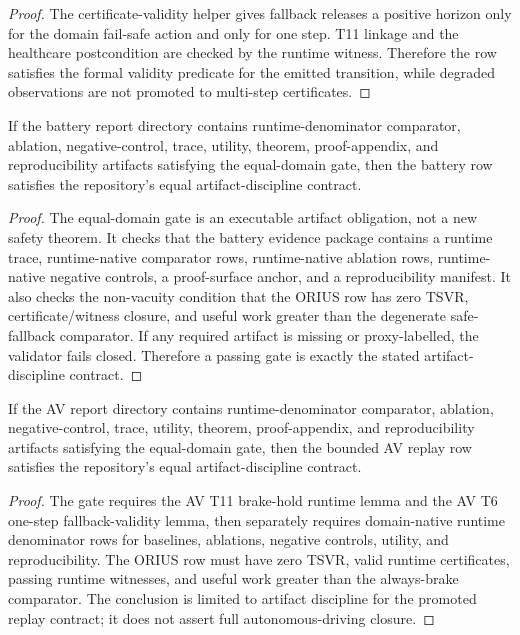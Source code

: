 \begin{proof}
The certificate-validity helper gives fallback releases a positive horizon
only for the domain fail-safe action and only for one step.  T11 linkage and
the healthcare postcondition are checked by the runtime witness.  Therefore
the row satisfies the formal validity predicate for the emitted transition,
while degraded observations are not promoted to multi-step certificates.
\end{proof}

\begin{lemma}
If the battery report directory contains runtime-denominator comparator,
ablation, negative-control, trace, utility, theorem, proof-appendix, and
reproducibility artifacts satisfying the equal-domain gate, then the battery
row satisfies the repository's equal artifact-discipline contract.
\end{lemma}

\begin{proof}
The equal-domain gate is an executable artifact obligation, not a new safety
theorem.  It checks that the battery evidence package contains a runtime
trace, runtime-native comparator rows, runtime-native ablation rows,
runtime-native negative controls, a proof-surface anchor, and a
reproducibility manifest.  It also checks the non-vacuity condition that the
ORIUS row has zero TSVR, certificate/witness closure, and useful work greater
than the degenerate safe-fallback comparator.  If any required artifact is
missing or proxy-labelled, the validator fails closed.  Therefore a passing
gate is exactly the stated artifact-discipline contract.
\end{proof}

\begin{lemma}
If the AV report directory contains runtime-denominator comparator,
ablation, negative-control, trace, utility, theorem, proof-appendix, and
reproducibility artifacts satisfying the equal-domain gate, then the bounded
AV replay row satisfies the repository's equal artifact-discipline contract.
\end{lemma}

\begin{proof}
The gate requires the AV T11 brake-hold runtime lemma and the AV T6
one-step fallback-validity lemma, then separately requires domain-native
runtime denominator rows for baselines, ablations, negative controls, utility,
and reproducibility.  The ORIUS row must have zero TSVR, valid runtime
certificates, passing runtime witnesses, and useful work greater than the
always-brake comparator.  The conclusion is limited to artifact discipline
for the promoted replay contract; it does not assert full autonomous-driving
closure.
\end{proof}

